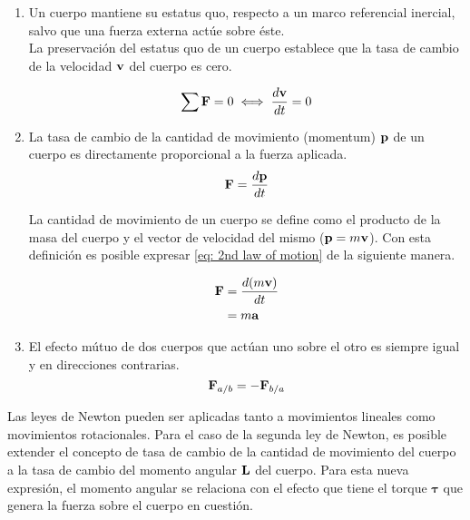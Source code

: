 \begin{enumerate}
 \item Un cuerpo mantiene su estatus quo, 
 respecto a un marco referencial inercial, salvo
 que una fuerza externa actúe sobre éste.\\
 
 La preservación del estatus quo de un cuerpo establece
 que la tasa de cambio de la velocidad $\bold{v}$ 
 del cuerpo es cero.
 
 \begin{equation}
  \sum \bold{F} = 0 \iff \dfrac{d \bold{v}}{dt} = 0
  \label{eq: 1st law of motion}
 \end{equation}

 \item La tasa de cambio de la cantidad de movimiento 
 (momentum) $\bold{p}$ de un cuerpo
 es directamente proporcional a la fuerza aplicada.
 \begin{equation}
  \bold{F} = \dfrac{d \bold{p}}{dt}
  \label{eq: 2nd law of motion}
 \end{equation}
 
 La cantidad de movimiento de un cuerpo se define como el 
 producto de la masa del cuerpo y el vector de velocidad 
 del mismo ($\bold{p} = m \bold{v}$). 
 Con esta definición es posible expresar 
 \eqref{eq: 2nd law of motion} de la siguiente manera.
 
 \begin{equation}
  \begin{split}
   \bold{F} &= \dfrac{d (m\bold{v})}{dt}\\
   &= m \bold{a}
  \end{split}
  \label{eq: conservation of linear momentum}
 \end{equation}


 \item El efecto mútuo de dos cuerpos que actúan 
 uno sobre el otro es siempre igual y en direcciones contrarias.
 \begin{equation}
  \bold{F}_{a/b} = -\bold{F}_{b/a}
  \label{eq: 3rd law of motion}
 \end{equation}

\end{enumerate}


Las leyes de Newton pueden ser aplicadas tanto a 
movimientos lineales como movimientos rotacionales.
Para el caso de la segunda ley de Newton, 
es posible extender el concepto de tasa de cambio
de la cantidad de movimiento del cuerpo 
a la tasa de cambio del momento angular $\bold{L}$
del cuerpo.
Para esta nueva expresión, el momento angular se relaciona
con el efecto que tiene el torque $\boldsymbol{\tau}$
que genera la fuerza sobre el cuerpo en cuestión.

